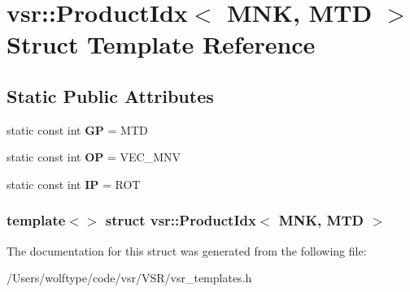 \hypertarget{structvsr_1_1_product_idx_3_01_m_n_k_00_01_m_t_d_01_4}{\section{vsr\-:\-:Product\-Idx$<$ M\-N\-K, M\-T\-D $>$ Struct Template Reference}
\label{structvsr_1_1_product_idx_3_01_m_n_k_00_01_m_t_d_01_4}
}
\subsection*{Static Public Attributes}
\begin{DoxyCompactItemize}
\item 
\hypertarget{structvsr_1_1_product_idx_3_01_m_n_k_00_01_m_t_d_01_4_abbb456019c7f5d254a1539119b77edeb}{static const int {\bfseries G\-P} = M\-T\-D}\label{structvsr_1_1_product_idx_3_01_m_n_k_00_01_m_t_d_01_4_abbb456019c7f5d254a1539119b77edeb}

\item 
\hypertarget{structvsr_1_1_product_idx_3_01_m_n_k_00_01_m_t_d_01_4_ae4c8c57c23f0c98bb6397e667360d438}{static const int {\bfseries O\-P} = V\-E\-C\-\_\-\-M\-N\-V}\label{structvsr_1_1_product_idx_3_01_m_n_k_00_01_m_t_d_01_4_ae4c8c57c23f0c98bb6397e667360d438}

\item 
\hypertarget{structvsr_1_1_product_idx_3_01_m_n_k_00_01_m_t_d_01_4_a1b1777b160211e6b98438af0e44a7000}{static const int {\bfseries I\-P} = R\-O\-T}\label{structvsr_1_1_product_idx_3_01_m_n_k_00_01_m_t_d_01_4_a1b1777b160211e6b98438af0e44a7000}

\end{DoxyCompactItemize}
\subsubsection*{template$<$$>$ struct vsr\-::\-Product\-Idx$<$ M\-N\-K, M\-T\-D $>$}



The documentation for this struct was generated from the following file\-:\begin{DoxyCompactItemize}
\item 
/\-Users/wolftype/code/vsr/\-V\-S\-R/vsr\-\_\-templates.\-h\end{DoxyCompactItemize}
